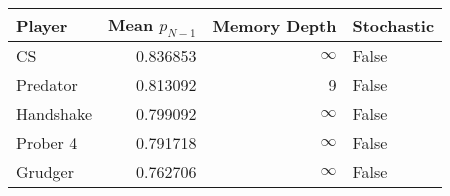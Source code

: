 \begin{tabular}{lrrl}
\toprule
    Player &  Mean $p_{N-1}$ &  Memory Depth & Stochastic \\
\midrule
        CS &        0.836853 &            \(\infty\) &      False \\
  Predator &        0.813092 &             9 &      False \\
 Handshake &        0.799092 &            \(\infty\) &      False \\
  Prober 4 &        0.791718 &            \(\infty\) &      False \\
   Grudger &        0.762706 &            \(\infty\) &      False \\
\bottomrule
\end{tabular}

